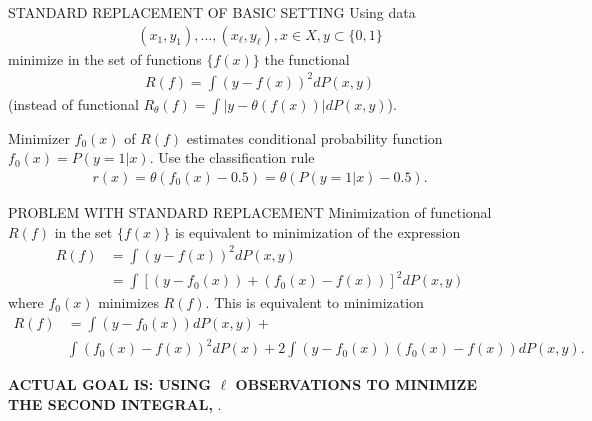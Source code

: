 \documentclass[11pt]{beamer}
\begin{document}
\begin{frame}{STANDARD REPLACEMENT OF BASIC SETTING}
Using data
\begin{align*}
(x_{1}, y_{1}), \ldots, (x_{\ell}, y_{\ell}), x \in X, y \subset \{0, 1\}
\end{align*}
minimize in the set of functions $\{f(x)\}$ the functional
\begin{align*}
R(f) = \int (y - f(x))^{2}dP(x, y)
\end{align*}
(instead of functional $R_{\theta}(f) = \int |y - \theta(f(x))|dP(x, y)$).

Minimizer $f_{0}(x)$ of $R(f)$ estimates conditional probability function $f_{0}(x) = P(y=1|x)$. Use the classification rule
\begin{align*}
r(x) = \theta(f_{0}(x) - 0.5) = \theta(P(y = 1|x) - 0.5).
\end{align*}
\end{frame}

\begin{frame}{PROBLEM WITH STANDARD REPLACEMENT}
Minimization of functional $R(f)$ in the set $\{f(x)\}$ is equivalent to minimization of the expression
\begin{align*}
R(f) &= \int (y - f(x))^{2}dP(x, y)\\
&= \int \left[(y - f_{0}(x)) + (f_{0}(x) - f(x)) \right]^{2}dP(x, y)
\end{align*}
where $f_{0}(x)$ minimizes $R(f)$. This is equivalent to minimization
\begin{align*}
R(f) &= \int (y - f_{0}(x))dP(x, y) + \\
&\int (f_{0}(x) - f(x))^{2}dP(x) + 2\int (y - f_{0}(x))(f_{0}(x)-f(x))dP(x,y).
\end{align*}

\begin{center}
\textbf{ACTUAL GOAL IS: USING $\ell$ OBSERVATIONS TO MINIMIZE THE SECOND INTEGRAL, {\color{blue}{NOT SUM OF LAST TWO INTEGRALS}}}.
\end{center}
\end{frame}
\end{document}
